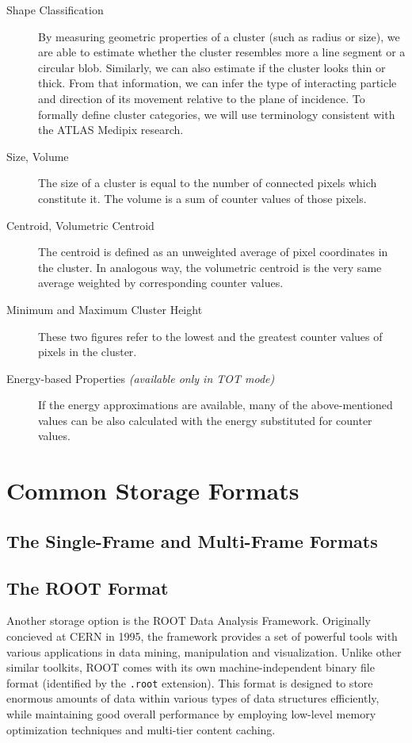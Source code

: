\begin{description}
	\item[Shape Classification]
	By measuring geometric properties of a cluster (such as radius or size), we are able to estimate whether the cluster resembles more a line segment or a circular blob. Similarly, we can also estimate if the cluster looks thin or thick. From that information, we can infer the type of interacting particle and direction of its movement relative to the plane of incidence. To formally define cluster categories, we will use terminology consistent with the ATLAS Medipix research.


	\item[Size, Volume]
	The size of a cluster is equal to the number of connected pixels which constitute it. The volume is a sum of counter values of those pixels.

	\item[Centroid, Volumetric Centroid]
	The centroid is defined as an unweighted average of pixel coordinates in the cluster. In analogous way, the volumetric centroid is the very same average weighted by corresponding counter values. 

	\item[Minimum and Maximum Cluster Height]
	These two figures refer to the lowest and the greatest counter values of pixels in the cluster.

	\item[Energy-based Properties \textit{(available only in TOT mode)}]
	If the energy approximations are available, many of the above-mentioned values can be also calculated with the energy substituted for counter values.
\end{description}

\section{Common Storage Formats}

\subsection{The Single-Frame and Multi-Frame Formats}

\subsection{The ROOT Format}
Another storage option is the ROOT Data Analysis Framework. Originally concieved at CERN in 1995, the framework provides a set of powerful tools with various applications in data mining, manipulation and visualization. Unlike other similar toolkits, ROOT comes with its own machine-independent binary file format (identified by the \texttt{.root} extension). This format is designed to store enormous amounts of data within various types of data structures efficiently, while maintaining good overall performance by employing low-level memory optimization techniques and multi-tier content caching.

